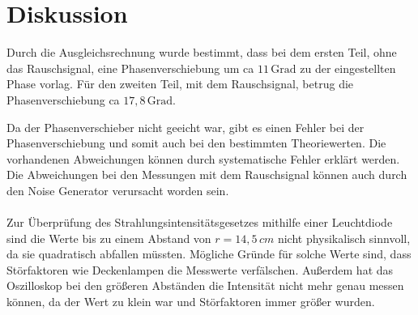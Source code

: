 \section{Diskussion}
Durch die Ausgleichsrechnung wurde bestimmt, dass bei dem ersten Teil, ohne das Rauschsignal,
eine Phasenverschiebung um ca $11 \, \text{Grad}$ zu der eingestellten Phase vorlag.
Für den zweiten Teil, mit dem Rauschsignal, betrug die Phasenverschiebung ca $ 17,8 \, \text{Grad}$.

Da der Phasenverschieber nicht geeicht war, gibt es einen Fehler bei der Phasenverschiebung
und somit auch bei den bestimmten Theoriewerten. Die vorhandenen Abweichungen können durch systematische Fehler
erklärt werden. Die Abweichungen bei den Messungen mit dem Rauschsignal können auch durch den Noise Generator
verursacht worden sein.\\\\

Zur Überprüfung des Strahlungsintensitätsgesetzes mithilfe einer Leuchtdiode sind die Werte bis zu einem
Abstand von $r = 14,5 \, cm$ nicht physikalisch sinnvoll, da sie quadratisch abfallen müssten.
Mögliche Gründe für solche Werte sind, dass Störfaktoren wie Deckenlampen die
Messwerte verfälschen. Außerdem hat das Oszilloskop bei den größeren Abständen die
Intensität nicht mehr genau messen können, da der Wert zu klein war und Störfaktoren
immer größer wurden.

